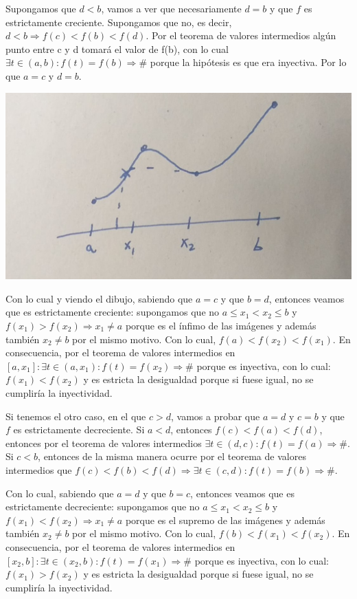 \documentclass[10pt,a4paper,openright]{book}
\begin{document}
\begin{enumerate}
\begin{itemize}
	Supongamos que $d<b$, vamos a ver que necesariamente $d=b$ y que $f$ es estrictamente creciente. Supongamos que no, es decir, $d<b\Rightarrow f(c)< f(b)< f(d)$. Por el teorema de valores intermedios algún punto entre c y d tomará el valor de f(b), con lo cual $\exists t\in (a,b): f(t)=f(b)\Rightarrow \#$ porque la hipótesis es que era inyectiva. Por lo que $a=c$ y $d=b$.
	
	\begin{center}
	\includegraphics[scale=0.25]{inyectividad a monotonia en continuas1}
	\end{center}
	
	Con lo cual y viendo el dibujo, sabiendo que $a=c$ y que $b=d$, entonces veamos que es estrictamente creciente: supongamos que no $a\leq x_1< x_2 \leq b$ y $f(x_1)>f(x_2)\Rightarrow x_1\neq a$ porque es el ínfimo de las imágenes y además también $x_2\neq b$ por el mismo motivo. Con lo cual, $f(a)< f(x_2)< f(x_1)$. En consecuencia, por el teorema de valores intermedios en $[a,x_1]: \exists t\in (a,x_1): f(t)=f(x_2)\Rightarrow \#$ porque es inyectiva, con lo cual: $f(x_1)<f(x_2)$ y es estricta la desigualdad porque si fuese igual, no se cumpliría la inyectividad.\par
		
	Si tenemos el otro caso, en el que $c>d$, vamos a probar que $a=d$ y $c=b$ y que $f$ es estrictamente decreciente. Si $a<d$, entonces $f(c)<f(a)<f(d)$, entonces por el teorema de valores intermedios $\exists t\in (d,c): f(t)=f(a)\Rightarrow \#$. Si $c<b$, entonces de la misma manera ocurre por el teorema de valores intermedios que $f(c)< f(b)< f(d)\Rightarrow \exists t\in (c,d): f(t)=f(b)\Rightarrow \#$.\par

Con lo cual, sabiendo que $a=d$ y que $b=c$, entonces veamos que es estrictamente decreciente: supongamos que no $a\leq x_1< x_2 \leq b$ y $f(x_1)<f(x_2)\Rightarrow x_1\neq a$ porque es el supremo de las imágenes y además también $x_2\neq b$ por el mismo motivo. Con lo cual, $f(b)< f(x_1)< f(x_2)$. En consecuencia, por el teorema de valores intermedios en $[x_2,b]: \exists t\in (x_2,b): f(t)=f(x_1)\Rightarrow \#$ porque es inyectiva, con lo cual: $f(x_1)>f(x_2)$ y es estricta la desigualdad porque si fuese igual, no se cumpliría la inyectividad.\par
	\end{itemize}
	

\end{enumerate}
\end{document}
